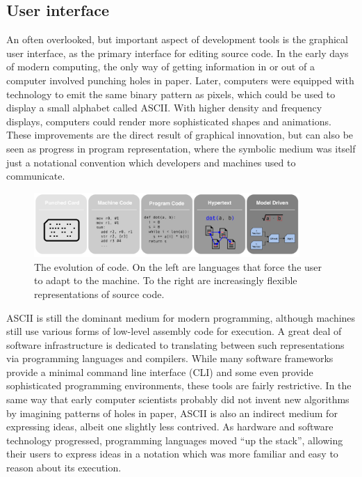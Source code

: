 \subsection{User interface}

An often overlooked, but important aspect of development tools is the graphical user interface, as the primary interface for editing source code. In the early days of modern computing, the only way of getting information in or out of a computer involved punching holes in paper. Later, computers were equipped with technology to emit the same binary pattern as pixels, which could be used to display a small alphabet called ASCII. With higher density and frequency displays, computers could render more sophisticated shapes and animations. These improvements are the direct result of graphical innovation, but can also be seen as progress in program representation, where the symbolic medium was itself just a notational convention which developers and machines used to communicate.

\begin{figure}
\centering
\includegraphics[width=0.90\textwidth]{../figures/progress_in_program.png}
\caption{The evolution of code. On the left are languages that force the user to adapt to the machine. To the right are increasingly flexible representations of source code.}
\label{fig:evolution_of_programming}
\end{figure}

ASCII is still the dominant medium for modern programming, although machines still use various forms of low-level assembly code for execution. A great deal of software infrastructure is dedicated to translating between such representations via programming languages and compilers. While many software frameworks provide a minimal command line interface (CLI) and some even provide sophisticated programming environments, these tools are fairly restrictive. In the same way that early computer scientists probably did not invent new algorithms by imagining patterns of holes in paper, ASCII is also an indirect medium for expressing ideas, albeit one slightly less contrived. As hardware and software technology progressed, programming languages moved ``up the stack'', allowing their users to express ideas in a notation which was more familiar and easy to reason about its execution.

